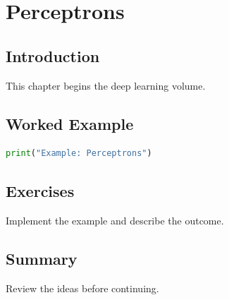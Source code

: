 \chapter{Perceptrons}
\label{chap:vol7-2}



\section{Introduction}
This chapter begins the deep learning volume.

\section{Worked Example}
\begin{lstlisting}[language=Python]
print("Example: Perceptrons")
\end{lstlisting}

\section{Exercises}
\begin{exercise}
Implement the example and describe the outcome.
\end{exercise}

\section{Summary}
Review the ideas before continuing.
